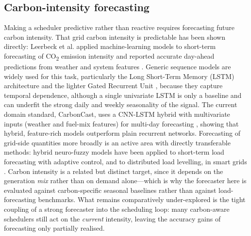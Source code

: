 \documentclass[12pt,a4paper]{article}
\providecommand{\DIFaddtex}[1]{{\protect\color{blue} \sf #1}} %
\providecommand{\DIFaddbegin}{} %
\providecommand{\DIFaddend}{} %
\providecommand{\DIFadd}[1]{\texorpdfstring{\DIFaddtex{#1}}{#1}} %
\providecommand{\DIFaddincludegraphics}[2][]{{\color{blue}\fbox{\DIFOincludegraphics[#1]{#2}}}} %
\DeclareRobustCommand{\DIFaddbegin}{\DIFOaddbegin \let\includegraphics\DIFaddincludegraphics} %
\DeclareRobustCommand{\DIFaddend}{\DIFOaddend \let\includegraphics\DIFOincludegraphics} %
\begin{document}
\subsection{Carbon-intensity forecasting}
Making a scheduler predictive rather than reactive requires forecasting future carbon intensity. That grid
carbon intensity is predictable has been shown directly: Leerbeck et al. applied machine-learning models to
short-term forecasting of CO\textsubscript{2} emission intensity and reported accurate day-ahead predictions
from weather and system features \cite{leerbeck2020short}. Generic sequence models are widely used for this
task, particularly the Long Short-Term Memory (LSTM) architecture \cite{hochreiter1997long} and the lighter
Gated Recurrent Unit \cite{cho2014learning}, because they capture temporal dependence, although a single
univariate LSTM is only a baseline and can underfit the strong daily and weekly seasonality of the signal. The
current domain standard, CarbonCast, uses a CNN-LSTM hybrid with multivariate inputs (weather and fuel-mix
features) for multi-day forecasting \cite{maji2022carboncast}, showing that hybrid, feature-rich models
outperform plain recurrent networks. \DIFaddbegin \DIFadd{Forecasting of grid-side quantities more
broadly is an active area with directly transferable methods: hybrid neuro-fuzzy models have been applied to
short-term load forecasting with adaptive control, and to distributed load levelling, in smart grids
\cite{wang2024load, wang2024levelling}. Carbon intensity is a related but distinct target, since it depends on
the generation \emph{mix} rather than on demand alone---which is why the forecaster here is evaluated against
carbon-specific seasonal baselines rather than against load-forecasting benchmarks. }\DIFaddend What remains
comparatively under-explored is the tight coupling of a strong forecaster into the scheduling loop: many
carbon-aware schedulers still act on the \emph{current} intensity, leaving the accuracy gains of forecasting
only partially realised.
\end{document}
